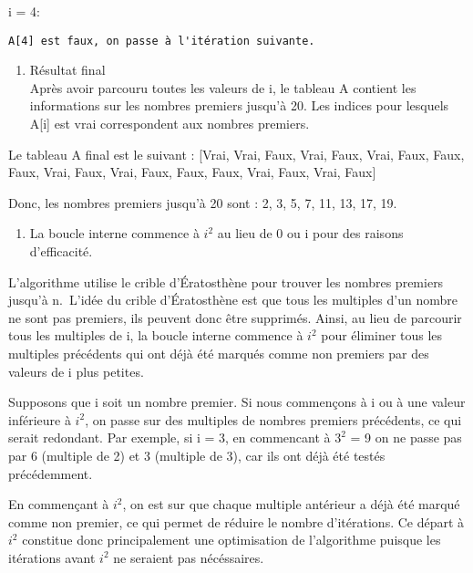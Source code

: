 \documentclass[
]{article}
\providecommand{\tightlist}{%
  \setlength{\itemsep}{0pt}\setlength{\parskip}{0pt}}
\begin{document}
i = 4:

\begin{verbatim}
A[4] est faux, on passe à l'itération suivante.  
\end{verbatim}

\begin{enumerate}
\def\labelenumi{\Alph{enumi})}
\setcounter{enumi}{2}
\tightlist
\item
  Résultat final\\
  Après avoir parcouru toutes les valeurs de i, le tableau A contient
  les informations sur les nombres premiers jusqu'à 20. Les indices pour
  lesquels A{[}i{]} est vrai correspondent aux nombres premiers.
\end{enumerate}

Le tableau A final est le suivant : {[}Vrai, Vrai, Faux, Vrai, Faux,
Vrai, Faux, Faux, Faux, Vrai, Faux, Vrai, Faux, Faux, Faux, Vrai, Faux,
Vrai, Faux{]}

Donc, les nombres premiers jusqu'à 20 sont : 2, 3, 5, 7, 11, 13, 17, 19.

\begin{enumerate}
\def\labelenumi{\arabic{enumi}.}
\setcounter{enumi}{1}
\tightlist
\item
  La boucle interne commence à \(i^2\) au lieu de 0 ou i pour des
  raisons d'efficacité.
\end{enumerate}

L'algorithme utilise le crible d'Ératosthène pour trouver les nombres
premiers jusqu'à n.~L'idée du crible d'Ératosthène est que tous les
multiples d'un nombre ne sont pas premiers, ils peuvent donc être
supprimés. Ainsi, au lieu de parcourir tous les multiples de i, la
boucle interne commence à \(i^2\) pour éliminer tous les multiples
précédents qui ont déjà été marqués comme non premiers par des valeurs
de i plus petites.

Supposons que i soit un nombre premier. Si nous commençons à i ou à une
valeur inférieure à \(i^2\), on passe sur des multiples de nombres
premiers précédents, ce qui serait redondant. Par exemple, si i = 3, en
commencant à \(3^2\) = 9 on ne passe pas par 6 (multiple de 2) et 3
(multiple de 3), car ils ont déjà été testés précédemment.

En commençant à \(i^2\), on est sur que chaque multiple antérieur a déjà
été marqué comme non premier, ce qui permet de réduire le nombre
d'itérations. Ce départ à \(i^2\) constitue donc principalement une
optimisation de l'algorithme puisque les itérations avant \(i^2\) ne
seraient pas nécéssaires.
\end{document}
